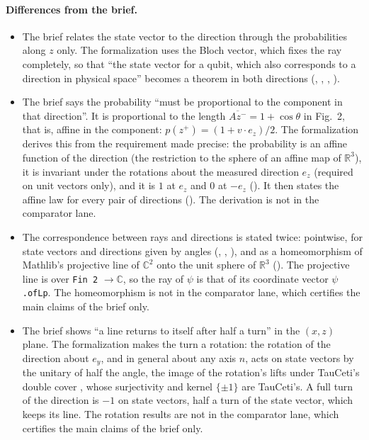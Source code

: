 \documentclass[11pt]{article}
\begin{document}
\paragraph{Differences from the brief.}
\begin{itemize}
\item The brief relates the state vector to the direction through the probabilities along $z$
  only. The formalization uses the Bloch vector, which fixes the ray completely, so that ``the
  state vector for a qubit, which also corresponds to a direction in physical space'' becomes a
  theorem in both directions (,
  , ,
  ).
\item The brief says the probability ``must be proportional to the component in that
  direction''. It is proportional to the length $\overline{Az^-} = 1 + \cos\theta$ in Fig.~2,
  that is, affine in the component: $p(z^+) = (1 + v\cdot e_z)/2$. The formalization derives this
  from the requirement made precise: the probability is an affine function of the direction
  (the restriction to the sphere of an affine map of $\mathbb{R}^3$), it is invariant under the
  rotations about the measured direction $e_z$ (required on unit vectors only), and it is $1$ at
  $e_z$ and $0$ at $-e_z$ (). It then states the affine
  law for every pair of directions (). The derivation is not in the
  comparator lane.
\item The correspondence between rays and directions is stated twice: pointwise, for state
  vectors and directions given by angles (,
  , ), and as a homeomorphism of
  Mathlib's projective line  of $\mathbb{C}^2$ onto the unit sphere of
  $\mathbb{R}^3$ (). The projective line is over
  \texttt{Fin 2} $\to \mathbb{C}$, so the ray of $\psi$ is that of its coordinate vector
  $\psi$\texttt{.ofLp}. The homeomorphism is not in the comparator lane, which certifies the
  main claims of the brief only.
\item The brief shows ``a line returns to itself after half a turn'' in the $(x,z)$ plane. The
  formalization makes the turn a rotation: the rotation of the direction about $e_y$, and in
  general about any axis $n$, acts on state vectors by the unitary of half the angle, the image
  of the rotation's lifts under TauCeti's double cover , whose
  surjectivity and kernel $\{\pm1\}$ are TauCeti's. A full turn of the direction is $-1$ on state
  vectors, half a turn of the state vector, which keeps its line. The rotation results are not
  in the comparator lane, which certifies the main claims of the brief only.
\end{itemize}
\end{document}
